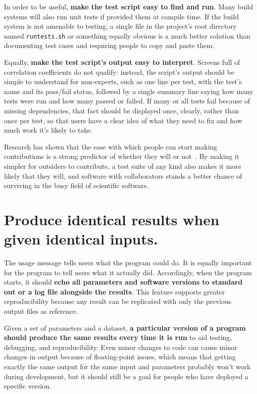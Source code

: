\documentclass[10pt,letterpaper]{article}
\begin{document}
In order to be useful, \textbf{make the test script easy to find and run}. 
Many build systems will also run unit tests if provided them at compile time.
If the build system is not amenable to testing, a 
single file in the project's root directory named \texttt{runtests.sh}
or something equally obvious is a much better solution than documenting
test cases and requiring people to copy and paste them.

Equally, \textbf{make the test script's output easy to interpret}. Screens
full of correlation coefficients do not qualify: instead, the script's
output should be simple to understand for non-experts,
such as one line per test, with the test's name
and its pass/fail status, followed by a single summary line saying how
many tests were run and how many passed or failed. If many or all tests
fail because of missing dependencies, that fact should be displayed
once, clearly, rather than once per test, so that users have a clear
idea of what they need to fix and how much work it's likely to take.

Research has shown that the ease with which people can start making
contributions is a strong predictor of whether they will or not~\cite{steinmacher2015}.
By making it simpler for outsiders to contribute,
a test suite of any kind also makes it more likely that they will, and software
with collaborators stands a better chance of surviving in the busy field of
scientific software.

\section{Produce identical results when given identical inputs.}

The usage message tells users what the program could do.
It is equally important for the program to tell users what it actually did.
Accordingly,
when the program starts, it should \textbf{echo all parameters and software
versions to standard out or a log file alongside the results}. This
feature supports greater reproducibility because any result can be
replicated with only the previous output files as reference.

Given a set of parameters and a dataset, \textbf{a particular version of a program
should produce the same results every time it is run}
to aid testing, debugging, and reproducibility.
Even minor changes to code can cause minor changes in output because of floating-point issues,
which means that getting exactly the same output for the same input and parameters
probably won't work during development,
but it should still be a goal for people who have deployed a specific version.
\end{document}
